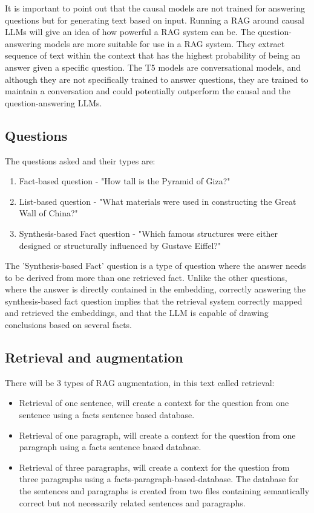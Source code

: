 \documentclass{wseas}
\begin{document}
It is important to point out that the causal models are not trained for
answering questions but for generating text based on input. Running a
RAG around causal LLMs will give an idea of how powerful a RAG system
can be. The question-answering models are more suitable for use in a
RAG system. They extract sequence of text within the context
that has the highest probability of being an answer given a specific
question. The T5 models are conversational models, and although they are
not specifically trained to answer questions, they are trained to
maintain a conversation and could potentially outperform the causal and the
question-answering LLMs.

\subsection{Questions}

The questions asked and their types are:

\begin{enumerate}
\def\labelenumi{\arabic{enumi}.}
\item
  Fact-based question - "How tall is the Pyramid of Giza?"
\item
  List-based question - "What materials were used in constructing the
  Great Wall of China?"
\item
  Synthesis-based Fact question - "Which famous structures were either
  designed or structurally influenced by Gustave Eiffel?"
\end{enumerate}

The 'Synthesis-based Fact' question is a type of question where the
answer needs to be derived from more than one retrieved fact. Unlike the
other questions, where the answer is directly contained in the
embedding, correctly answering the synthesis-based fact question implies
that the retrieval system correctly mapped and retrieved the embeddings,
and that the LLM is capable of drawing conclusions based on several
facts.


\subsection{Retrieval and augmentation}

There will be 3 types of RAG augmentation, in this text called
retrieval:

\begin{itemize}
\item
  Retrieval of one sentence, will create a context for the question from
  one sentence using a facts sentence based database.
\item
  Retrieval of one paragraph, will create a context for the question
  from one paragraph using a facts sentence based database.
\item
  Retrieval of three paragraphs, will create a context for the question
  from three paragraphs using a facts-paragraph-based-database. The
  database for the sentences and paragraphs is created from two files
  containing semantically correct but not necessarily related sentences
  and paragraphs.
\end{itemize}
\end{document}
